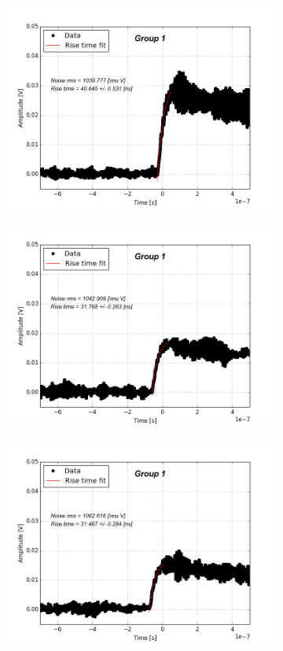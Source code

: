 \documentclass[12pt]{article}
\begin{document}
\begin{figure}[t!]
\begin{subfigure}[t]{0.45\textwidth}
    \includegraphics[width=1.2\textwidth]{./graphics/data_8.png}
  \end{subfigure}
  \hfill
  \begin{subfigure}[t]{0.45\textwidth}
    \centering
    \includegraphics[width=1.2\textwidth]{./graphics/data_9.png}
  \end{subfigure}
  \hfill
  \begin{subfigure}[t]{0.45\textwidth}
    \centering
    \includegraphics[width=1.2\textwidth]{./graphics/data_10.png}

\end{subfigure}
\end{figure}
\end{document}
